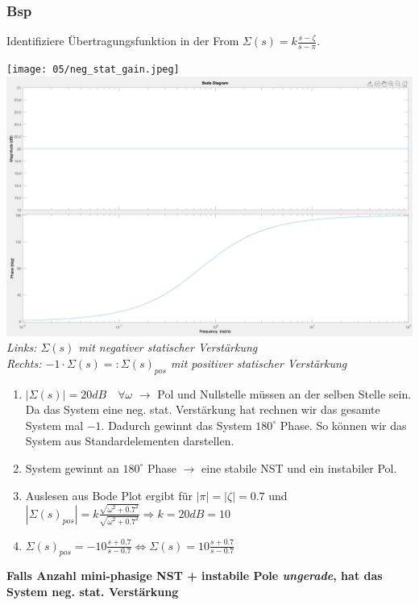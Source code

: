         \subsubsection{Bsp}
            Identifiziere Übertragungsfunktion in der From $\Sigma(s)=k\frac{s-\zeta}{s-\pi}$.
            \begin{center}
                \texttt{[image: 05/neg\_stat\_gain.jpeg]}
                \includegraphics[width=0.5\linewidth]{images/05/neg_stat_gain_2.png}
                \small{\textit{Links: $\Sigma(s)$ mit negativer statischer Verstärkung}\\
                \textit{Rechts: $-1\cdot\Sigma(s)=:\Sigma(s)_{pos}$ mit positiver statischer Verstärkung}}
            \end{center}
            \begin{enumerate}
                \item $|\Sigma(s)|=20dB \quad\forall\omega$ $\rightarrow$ Pol und Nullstelle müssen an der selben Stelle sein. Da das System eine neg. stat. Verstärkung hat rechnen wir das gesamte System mal $-1$. Dadurch gewinnt das System $180^{\circ}$ Phase. So können wir das System aus Standardelementen darstellen.
                \item System gewinnt an $180^{\circ}$ Phase $\rightarrow$ eine stabile NST und ein instabiler Pol.
                \item Auslesen aus Bode Plot ergibt für $|\pi|=|\zeta|=0.7$ und $|\Sigma(s)_{pos}|=k\frac{\sqrt{\omega^2+0.7^2}}{\sqrt{\omega^2+0.7^2}} \Rightarrow k=20dB=10$
                \item $\Sigma(s)_{pos}=-10\frac{s+0.7}{s-0.7} \Leftrightarrow \Sigma(s)=10\frac{s+0.7}{s-0.7}$
            \end{enumerate}
                \begin{center}
                    \textbf{Falls Anzahl mini-phasige NST + instabile Pole \textit{ungerade}, hat das System neg. stat. Verstärkung}
                \end{center}
                
                
